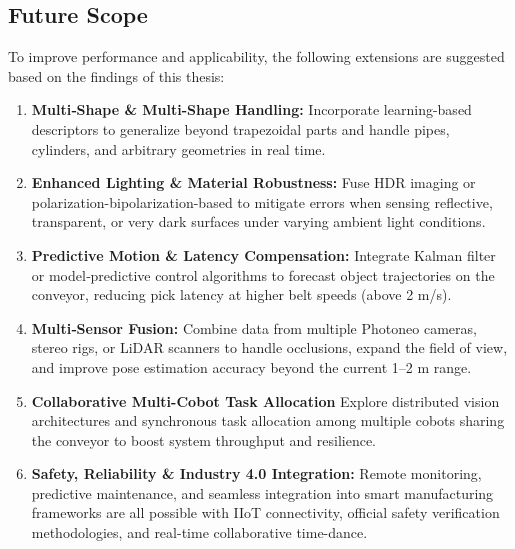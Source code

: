 \documentclass[12pt]{article}
\begin{document}
\subsection{Future Scope }
To improve performance and applicability, the following extensions are suggested based on the findings of this thesis:
\begin{enumerate}    
  \item \textbf{Multi‐Shape \& Multi-Shape Handling:}  
    Incorporate learning-based descriptors to generalize beyond trapezoidal parts and handle pipes, cylinders, and arbitrary geometries in real time.\\
  
  \item \textbf{Enhanced Lighting \& Material Robustness:}  
    Fuse HDR imaging or polarization-bipolarization-based to mitigate errors when sensing reflective, transparent, or very dark surfaces under varying ambient light conditions.\\
  
  \item \textbf{Predictive Motion \& Latency Compensation:}  
    Integrate Kalman filter or model‐predictive control algorithms to forecast object trajectories on the conveyor, reducing pick latency at higher belt speeds (above 2 m/s).\\
  
  \item \textbf{Multi‐Sensor Fusion:}  
    Combine data from multiple Photoneo cameras, stereo rigs, or LiDAR scanners to handle occlusions, expand the field of view, and improve pose estimation accuracy beyond the current 1–2 m range.\\
  
  \item \textbf{Collaborative Multi-Cobot Task Allocation}  
    Explore distributed vision architectures and synchronous task allocation among multiple cobots sharing the conveyor to boost system throughput and resilience.\\
  
  \item \textbf{Safety, Reliability \& Industry 4.0 Integration:}  
  Remote monitoring, predictive maintenance, and seamless integration into smart manufacturing frameworks are all possible with IIoT connectivity, official safety verification methodologies, and real-time collaborative time-dance.
\end{enumerate}

\newpage
\printbibliography
\end{document}
